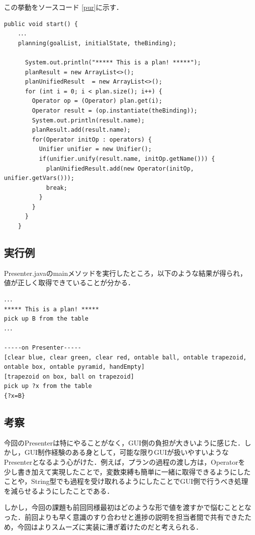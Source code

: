 \documentclass[12pt]{jarticle}
\begin{document}
この挙動をソースコード
\ref{pur}に示す．

\begin{lstlisting}[caption=Plannerクラスのstartメソッドの一部, label=pur]
  public void start() {
    ．．．
    planning(goalList, initialState, theBinding);

      System.out.println("***** This is a plan! *****");
      planResult = new ArrayList<>();
      planUnifiedResult  = new ArrayList<>();
      for (int i = 0; i < plan.size(); i++) {
        Operator op = (Operator) plan.get(i);
        Operator result = (op.instantiate(theBinding));
        System.out.println(result.name);
        planResult.add(result.name);
        for(Operator initOp : operators) {
          Unifier unifier = new Unifier();
          if(unifier.unify(result.name, initOp.getName())) {
            planUnifiedResult.add(new Operator(initOp, unifier.getVars()));
            break;
          }
        }
      }
    }
\end{lstlisting}

\subsection{実行例}
Presenter.javaのmainメソッドを実行したところ，以下のような結果が得られ，値が正しく取得できていることが分かる．

\begin{lstlisting}[caption=Presenterの実行, label=pres]
．．．
***** This is a plan! *****
pick up B from the table
．．．

-----on Presenter-----
[clear blue, clear green, clear red, ontable ball, ontable trapezoid, ontable box, ontable pyramid, handEmpty]
[trapezoid on box, ball on trapezoid]
pick up ?x from the table
{?x=B}
\end{lstlisting}

\subsection{考察}
今回のPresenterは特にやることがなく，GUI側の負担が大きいように感じた．しかし，GUI制作経験のある身として，可能な限りGUIが扱いやすいようなPresenterとなるよう心がけた．例えば，プランの過程の渡し方は，Operatorを少し書き加えて実現したことで，変数束縛も簡単に一緒に取得できるようにしたことや，String型でも過程を受け取れるようにしたことでGUI側で行うべき処理を減らせるようにしたことである．

しかし，今回の課題も前回同様最初はどのような形で値を渡すかで悩むこととなった．前回よりも早く意識のすり合わせと進捗の説明を担当者間で共有できたため，今回はよりスムーズに実装に漕ぎ着けたのだと考えられる．
\end{document}
